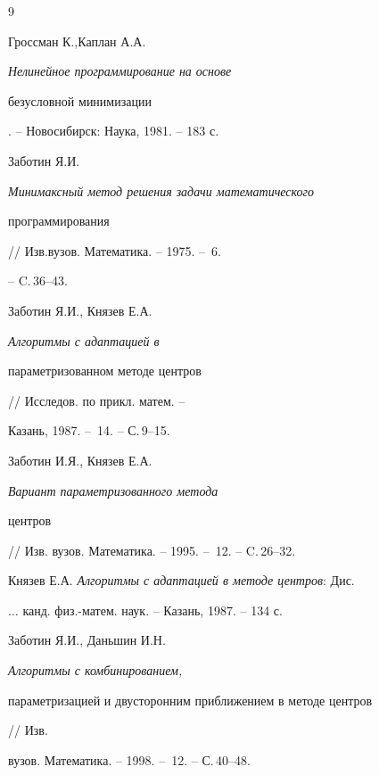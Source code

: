\begin{thebibliography}{9}







Гроссман К.,Каплан А.А. {\it Нелинейное программирование на основе


безусловной минимизации}. -- Новосибирск: Наука, 1981. -- 183 с.




Заботин Я.И. {\it Минимаксный метод решения задачи математического


программирования} // Изв.вузов. Математика. -- 1975. -- \No\,6.


-- C.\,36--43.




Заботин Я.И., Князев Е.А. {\it Алгоритмы с адаптацией в


параметризованном методе центров} // Исследов. по прикл. матем. --


Казань, 1987. -- \No\,14. -- С.\,9--15.




Заботин И.Я., Князев Е.А. {\it Вариант параметризованного метода


центров} // Изв. вузов. Математика. -- 1995. -- \No\,12. -- C.\,26--32.




Князев Е.А. {\it Алгоритмы с адаптацией в методе центров}: Дис.


$\dotsc$ канд. физ.-матем. наук. -- Казань, 1987. -- 134 с.




Заботин Я.И., Даньшин И.Н. {\it Алгоритмы с комбинированием,


параметризацией и двусторонним приближением в методе центров} // Изв.


вузов. Математика. -- 1998. -- \No\,12. -- С.\,40--48.





\end{thebibliography}





\vskip 2cm












\label{end}






